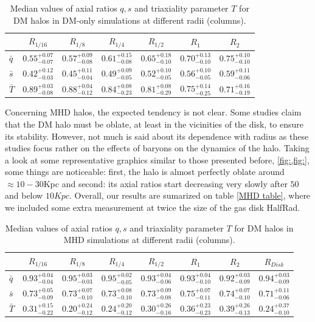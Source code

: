 \documentclass[a4paper,fleqn,usenatbib]{mnras}
\begin{document}
\begin{table}
\setlength{\tabcolsep}{3pt}
\begin{tabular}{l|cccccc}
 &$R_{1/16}$& $R_{1/8}$& $R_{1/4}$& $R_{1/2}$& $R_1$ & $R_2$\\
\hline \hline
$\bar{q}$&$0.55^{+0.07}_{-0.07}$&$0.57^{+0.09}_{-0.08}$&$0.61^{+0.15}_{-0.08}$&$0.65^{+0.18}_{-0.10}$&$0.70^{+0.13}_{-0.10}$&$0.75^{+0.10}_{-0.10}$ \\ [0.1cm]
$\bar{s}$&$0.42^{+0.12}_{-0.03}$&$0.45^{+0.11}_{-0.04}$&$0.49^{+0.09}_{-0.05}$&$0.52^{+0.10}_{-0.05}$&$0.56^{+0.10}_{-0.05}$&$0.59^{+0.11}_{-0.06}$ \\ [0.1cm]
$\bar{T}$&$0.89^{+0.03}_{-0.08}$&$0.88^{+0.04}_{-0.12}$&$0.84^{+0.08}_{-0.23}$&$0.81^{+0.08}_{-0.29}$&$0.75^{+0.14}_{-0.25}$&$0.71^{+0.16}_{-0.19}$ \\ [0.1cm]

\hline
\end{tabular}
\caption{Median values of axial ratios $q,s$ and triaxiality parameter $T$ for DM halos in DM-only simulations at different radii (columns). }
\label{tabe:DM table}
\end{table}

Concerning MHD halos, the expected tendency is not clear. Some studies claim that the DM halo must be oblate, at least in the vicinities of the disk, to ensure its stability. However, not much is said about its dependence with radius as these studies focus rather on the effects of baryons on the dynamics of the halo. Taking a look at some representative graphics similar to those presented before, \ref{fig:,fig:}, some things are noticeable: first, the halo is almost perfectly oblate around $\approx 10-30$Kpc and second: its axial ratios start decreasing very slowly after $50$ and below $10Kpc$. Overall, our results are sumarized on table \ref{MHD table}, where we included some extra measurement at twice the size of the gas disk HalfRad.\\

\begin{table}
\setlength{\tabcolsep}{3pt}
\begin{tabular}{l|ccccccc}
 &$R_{1/16}$& $R_{1/8}$& $R_{1/4}$& $R_{1/2}$& $R_1$ & $R_2$& $R_{Disk}$\\
\hline \hline
$\bar{q}$&$0.93^{+0.04}_{-0.04}$&$0.95^{+0.03}_{-0.03}$&$0.95^{+0.02}_{-0.05}$&$0.93^{+0.04}_{-0.06}$&$0.93^{+0.04}_{-0.10}$&$0.92^{+0.03}_{-0.09}$&$0.94^{+0.03}_{-0.09}$ \\[0.1cm]
$\bar{s}$&$0.73^{+0.05}_{-0.09}$&$0.73^{+0.07}_{-0.10}$&$0.73^{+0.08}_{-0.10}$&$0.73^{+0.09}_{-0.08}$&$0.75^{+0.07}_{-0.11}$&$0.74^{+0.07}_{-0.10}$&$0.71^{+0.11}_{-0.06}$ \\[0.1cm]
$\bar{T}$&$0.31^{+0.15}_{-0.22}$&$0.20^{+0.24}_{-0.12}$&$0.24^{+0.20}_{-0.12}$&$0.30^{+0.26}_{-0.16}$&$0.36^{+0.23}_{-0.23}$&$0.39^{+0.26}_{-0.13}$&$0.24^{+0.37}_{-0.10}$ \\[0.1cm]
\hline
\end{tabular}
\caption{Median values of axial ratios $q,s$ and triaxiality parameter $T$ for DM halos in MHD simulations at different radii (columns). }
\label{tabe:MHD table}
\end{table}
\end{document}
